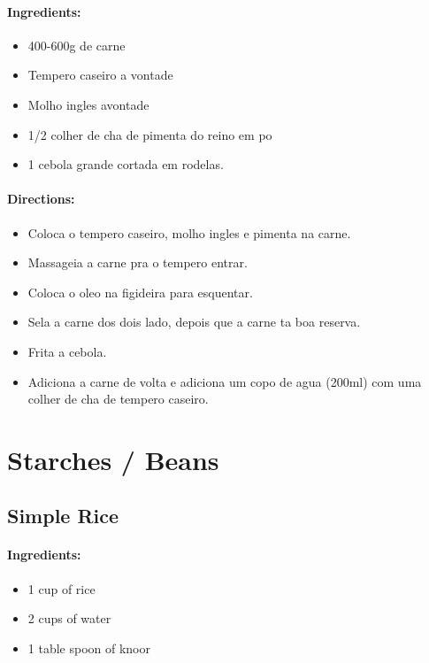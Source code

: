 \documentclass{article}
\begin{document}
\paragraph{Ingredients:}
\begin{itemize}
    \item 400-600g de carne
    \item Tempero caseiro a vontade
    \item Molho ingles  avontade
    \item 1/2 colher de cha de pimenta do reino em po
    \item 1 cebola grande cortada em rodelas.
\end{itemize}

\paragraph{Directions:}
\begin{itemize}
    \item Coloca o tempero caseiro, molho ingles e pimenta na carne.
    \item Massageia a carne pra o tempero entrar.
    \item Coloca o oleo na figideira para esquentar.
    \item Sela a carne dos dois lado, depois que a carne ta boa reserva.
    \item Frita a cebola.
    \item Adiciona a carne de volta e adiciona um copo de agua (200ml) com uma colher de cha de tempero caseiro.
\end{itemize}

\section{Starches / Beans}


\subsection{Simple Rice}

\paragraph{Ingredients:}
\begin{itemize}
    \item 1 cup of rice
    \item 2 cups of water
    \item 1 table spoon of knoor
\end{itemize}
\end{document}
